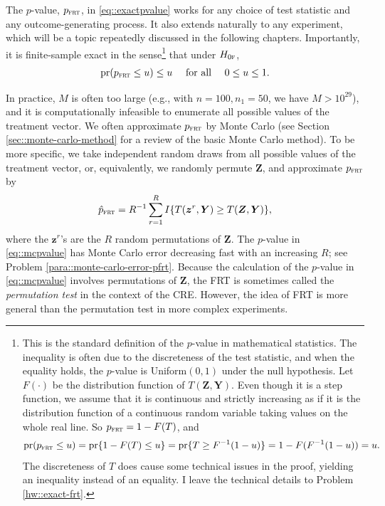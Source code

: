 The $p$-value, $p_{\textsc{frt}}$,  in \eqref{eq::exactpvalue} works for any choice of test statistic and any outcome-generating process. It also extends naturally to any experiment, which will be a topic repeatedly discussed in the following chapters. Importantly, it is finite-sample exact in the sense\footnote{This is the standard definition of the $p$-value in mathematical statistics. The inequality is often due to the discreteness of the test statistic, and when the equality holds, the $p$-value is Uniform$(0,1)$ under the null hypothesis. Let $F(\cdot)$ be the distribution function of $T(\bm{Z},\bm{Y})$. Even though it is a step function, we assume that it is continuous and strictly increasing as if it is the distribution function of a continuous random variable taking values on the whole real line.  So $p_{\textsc{frt}} = 1- F(T)$, and  
$$
\textup{pr}(p_{\textsc{frt}} \leq u) = \textup{pr}\{ 1-F(T) \leq u\} = \textup{pr}\{  T \geq F^{-1}(1-u)  \} = 1- F( F^{-1}(1-u)) = u.
$$
The discreteness of $T$ does cause some technical issues in the proof, yielding an inequality instead of an equality. I leave the technical details to Problem \ref{hw::exact-frt}.}  that under $H_{0\textsc{f}}$,
\begin{eqnarray}\label{eq::p-value-valid}
\pr(p_\frt \leq u) \leq u \quad  \text{ for all } \quad 0 \leq u \leq 1.
\end{eqnarray}




In practice, $M$ is often too large (e.g., with $n=100, n_1=50$, we have $M > 10^{29}$), and it is computationally infeasible to enumerate all possible values of the treatment vector. We often approximate $p_{\textsc{frt}}$ by Monte Carlo (see Section \ref{sec::monte-carlo-method} for a review of the basic Monte Carlo method). To be more specific, we take independent random draws from all possible values of the treatment vector, or, equivalently, we randomly permute $\bm{Z}$, and approximate $p_{\textsc{frt}}$ by
\begin{equation}\label{eq::mcpvalue}
\hat p_\frt  =  R^{-1} \sum_{r=1}^R   I\{ T(\bm{z}^r,\bm{Y})   \geq T(\bm{Z},\bm{Y})   \},
\end{equation}
where the $\bm{z}^r$'s are the $R$ random permutations of $\bm{Z}$.
The $p$-value in \eqref{eq::mcpvalue} has Monte Carlo error decreasing fast with an increasing $R$; see Problem \ref{para::monte-carlo-error-pfrt}. Because the calculation of the $p$-value in \eqref{eq::mcpvalue} involves permutations of $\bm{Z}$, the FRT is sometimes called the {\it permutation test} in the context of the CRE. However, the idea of FRT is more general than the permutation test in more complex experiments. 



